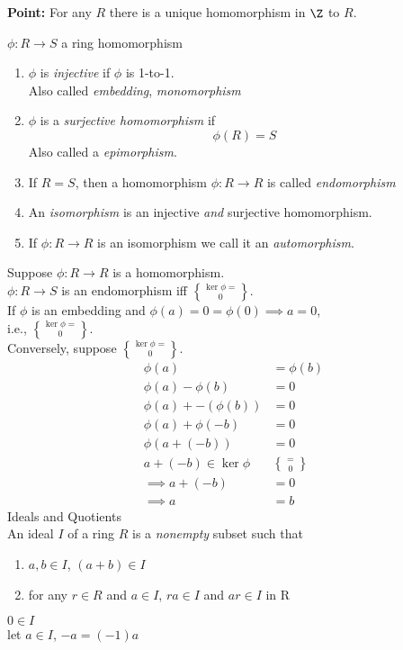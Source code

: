 \textbf{Point:} For any $R$ there is a unique homomorphism in $\Z$ to $R$.

 $\phi\colon R\to S$ a ring homomorphism
\begin{enumerate}
\item $\phi$ is \emph{injective} if $\phi$ is 1-to-1. \\
Also called \emph{embedding}, \emph{monomorphism}
\item $\phi$ is a \emph{surjective homomorphism} if
\[ \phi(R) = S \]
Also called a \emph{epimorphism}.
\item If $R=S$, then a homomorphism $\phi\colon R\to R$ is called \emph{endomorphism}
\item An \emph{isomorphism} is an injective \emph{and} surjective homomorphism.
\item If $\phi\colon R\to R$ is an isomorphism we call it an \emph{automorphism}.
\end{enumerate}

Suppose $\phi\colon R\to R$ is a homomorphism. \\
\lem $\phi\colon R\to S$ is an endomorphism iff $\ker\phi=\brace0$. \\
\pf If $\phi$ is an embedding and $\phi(a)=0=\phi(0)\implies a=0$, \\
i.e., $\ker\phi=\brace0$. \\
Conversely, suppose $\ker\phi=\brace0$.
%
\begin{align*}
\phi(a) &= \phi(b) \\
\phi(a)-\phi(b) &= 0 \\
\phi(a) + -(\phi(b)) &= 0 \\
\phi(a) + \phi(-b) &= 0 \\
\phi(a+(-b)) &= 0 \\
a + (-b) \in \ker\phi &= \brace0 \\
\implies a + (-b) &= 0 \\
\implies a &= b
\end{align*}
%
Ideals and Quotients \\
 An ideal $I$ of a ring $R$ is a \emph{nonempty} subset such that
\begin{enumerate}
\item $a,b\in I$, $(a+b)\in I$
\item for any $r\in R$ and $a\in I$, $ra\in I$ and $ar\in I$ in R
\end{enumerate}
\remark $0\in I$ \\
let $a\in I$, $-a=(-1)a$